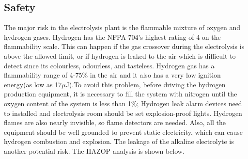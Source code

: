 \doublespacing
\subsection{Safety}

The major risk in the electrolysis plant is the flammable mixture of oxygen and hydrogen gases.
Hydrogen has the NFPA 704's highest rating of 4 on the flammability scale. \cite{safety} This can happen if the gas crossover during the electrolysis is above the allowed limit, or if hydrogen is leaked to the air which is difficult to detect since its colourless, odourless, and tasteless. Hydrogen gas has a flammability range of 4-75\% in the air and it also has a very low ignition energy(as low as 17$\mu$J).\cite{gibbs}To avoid this problem, 
before driving the hydrogen production equipment, it is necessary to fill the system with nitrogen until the oxygen content of the system is less than 1\%; Hydrogen leak alarm devices need to installed and electrolysis room should be set explosion-proof lights. Hydrogen flames are also nearly invisible, so flame detectors are needed. Also, all the equipment should be well grounded to prevent static electricity, which can cause hydrogen combustion and explosion. The leakage of the alkaline electrolyte is another potential risk. The HAZOP analysis is shown below.

